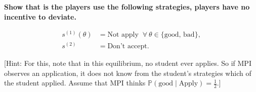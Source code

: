 \documentclass[10pt]{article}
\begin{document}
\textbf{Show that is the players use the following strategies, players have no incentive to
deviate.}

\begin{align*}
    s^{(1)}(\theta) & = \text{Not apply } \ \forall \ \theta \in \{\text{good, bad}\}, \\
    s^{(2)} & = \text{Don't accept}.
\end{align*}

[Hint: For this, note that in this equilibrium, no student ever applies. So if MPI
observes an application, it does not know from the student's strategies which
of the student applied. Assume that MPI thinks
\(\mathbb{P}(\text{good} \mid \text{Apply}) = \frac{1}{2}\).]
\end{document}
